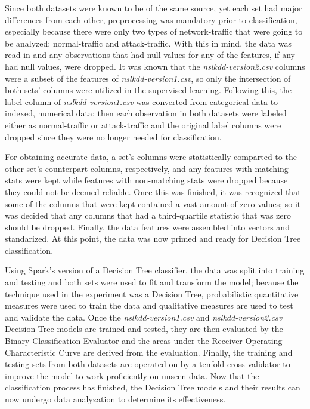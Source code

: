\documentclass[a4paper,12pt]{IEEEtran}
\begin{document}
Since both datasets were known to be of the same source, yet each set had major differences from each other, preprocessing was mandatory prior to classification, especially because there were only two types of network-traffic that were going to be analyzed: normal-traffic and attack-traffic. With this in mind, the data was read in and any observations that had null values for any of the features, if any had null values, were dropped. It was known that the \textit{nslkdd-version2.csv} columns were a subset of the features of \textit{nslkdd-version1.csv}, so only the intersection of both sets' columns were utilized in the supervised learning. Following this, the label column of \textit{nslkdd-version1.csv} was converted from categorical data to indexed, numerical data; then each observation in both datasets were labeled either as normal-traffic or attack-traffic and the original label columns were dropped since they were no longer needed for classification.

For obtaining accurate data, a set's columns were statistically comparted to the other set's counterpart columns, respectively, and any features with matching stats were kept while features with non-matching stats were dropped because they could not be deemed reliable. Once this was finished, it was recognized that some of the columns that were kept contained a vast amount of zero-values; so it was decided that any columns that had a third-quartile statistic that was zero should be dropped. Finally, the data features were assembled into vectors and standarized. At this point, the data was now primed and ready for Decision Tree classification.

Using Spark's version of a Decision Tree classifier, the data was split into training and testing and both sets were used to fit and transform the model; because the technique used in the experiment was a Decision Tree, probabilistic quantitative measures were used to train the data and qualitative measures are used to test and validate the data. Once the \textit{nslkdd-version1.csv} and \textit{nslkdd-version2.csv} Decision Tree models are trained and tested, they are then evaluated by the Binary-Classification Evaluator and the areas under the Receiver Operating Characteristic Curve are derived from the evaluation. Finally, the training and testing sets from both datasets are operated on by a tenfold cross validator to improve the model to work proficiently on unseen data. Now that the classification process has finished, the Decision Tree models and their results can now undergo data analyzation to determine its effectiveness.
\end{document}
